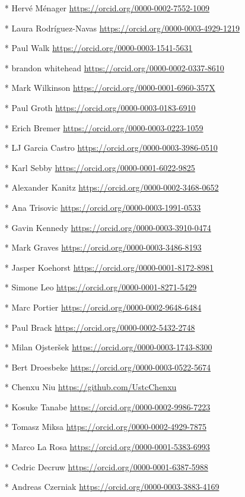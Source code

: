 \documentclass[ds,v1.1.2,openaccess]{iosart2x}%
\begin{document}
\begin{appendix}
\begin{itemize}
\item[*] Herv\'{e} M\'{e}nager \url{https://orcid.org/0000-0002-7552-1009}
\item[*] Laura Rodr\'iguez-Navas \url{https://orcid.org/0000-0003-4929-1219}
\item[*] Paul Walk \url{https://orcid.org/0000-0003-1541-5631}
\item[*] brandon whitehead \url{https://orcid.org/0000-0002-0337-8610}
\item[*] Mark Wilkinson \url{https://orcid.org/0000-0001-6960-357X}
\item[*] Paul Groth \url{https://orcid.org/0000-0003-0183-6910}
\item[*] Erich Bremer \url{https://orcid.org/0000-0003-0223-1059}
\item[*] LJ Garcia Castro \url{https://orcid.org/0000-0003-3986-0510}
\item[*] Karl Sebby \url{https://orcid.org/0000-0001-6022-9825}
\item[*] Alexander Kanitz \url{https://orcid.org/0000-0002-3468-0652}
\item[*] Ana Trisovic \url{https://orcid.org/0000-0003-1991-0533}
\item[*] Gavin Kennedy \url{https://orcid.org/0000-0003-3910-0474}
\item[*] Mark Graves \url{https://orcid.org/0000-0003-3486-8193}
\item[*] Jasper Koehorst \url{https://orcid.org/0000-0001-8172-8981}
\item[*] Simone Leo \url{https://orcid.org/0000-0001-8271-5429}
\item[*] Marc Portier \url{https://orcid.org/0000-0002-9648-6484}
\item[*] Paul Brack \url{https://orcid.org/0000-0002-5432-2748}
\item[*] Milan Ojster\v{s}ek \url{https://orcid.org/0000-0003-1743-8300}
\item[*] Bert Droesbeke \url{https://orcid.org/0000-0003-0522-5674}
\item[*] Chenxu Niu \url{https://github.com/UstcChenxu}
\item[*] Kosuke Tanabe \url{https://orcid.org/0000-0002-9986-7223}
\item[*] Tomasz Miksa \url{https://orcid.org/0000-0002-4929-7875}
\item[*] Marco La Rosa \url{https://orcid.org/0000-0001-5383-6993}
\item[*] Cedric Decruw \url{https://orcid.org/0000-0001-6387-5988}
\item[*] Andreas Czerniak \url{https://orcid.org/0000-0003-3883-4169}

\end{itemize}
\end{appendix}
\end{document}
